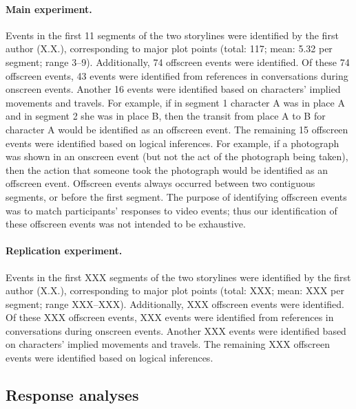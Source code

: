\documentclass[10pt]{article}
\begin{document}
\paragraph{Main experiment.} Events in the first 11 segments of the two storylines were identified by the first author (X.X.), corresponding to major plot points (total: 117; mean: 5.32 per segment; range 3--9). Additionally, 74 offscreen events were identified. Of these 74 offscreen events, 43 events were identified from references in conversations during onscreen events. Another 16 events were identified based on characters’ implied movements and travels. For example, if in segment 1 character A was in place A and in segment 2 she was in place B, then the transit from place A to B for character A would be identified as an offscreen event. The remaining 15 offscreen events were identified based on logical inferences. For example, if a photograph was shown in an onscreen event (but not the act of the photograph being taken), then the action that someone took the photograph would be identified as an offscreen event. Offscreen events always occurred between two contiguous segments, or before the first segment. The purpose of identifying offscreen events was to match participants’ responses to video events; thus our identification of these offscreen events was not intended to be exhaustive.

\paragraph{Replication experiment.} Events in the first XXX segments of the two storylines were identified by the first author (X.X.), corresponding to major plot points (total: XXX; mean: XXX per segment; range XXX--XXX). Additionally, XXX offscreen events were identified. Of these XXX offscreen events, XXX events were identified from references in conversations during onscreen events. Another XXX events were identified based on characters’ implied movements and travels. The remaining XXX offscreen events were identified based on logical inferences.

\subsection*{Response analyses}
\end{document}
